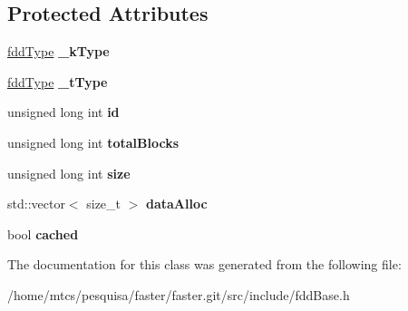 \subsection*{Protected Attributes}
\begin{DoxyCompactItemize}
\item 
\hypertarget{classfaster_1_1fddBase_a585bdd9659c1ab92cf615c73fc4d9ac7}{}\label{classfaster_1_1fddBase_a585bdd9659c1ab92cf615c73fc4d9ac7} 
\hyperlink{namespacefaster_aa8898687bc64536b60a3d5f365060cd6}{fdd\+Type} {\bfseries \+\_\+k\+Type}
\item 
\hypertarget{classfaster_1_1fddBase_a7ee5fc280f8eed2ffe97ef9c7a8b0919}{}\label{classfaster_1_1fddBase_a7ee5fc280f8eed2ffe97ef9c7a8b0919} 
\hyperlink{namespacefaster_aa8898687bc64536b60a3d5f365060cd6}{fdd\+Type} {\bfseries \+\_\+t\+Type}
\item 
\hypertarget{classfaster_1_1fddBase_a6ebf1389a80e31abed31f5b85d99fa1a}{}\label{classfaster_1_1fddBase_a6ebf1389a80e31abed31f5b85d99fa1a} 
unsigned long int {\bfseries id}
\item 
\hypertarget{classfaster_1_1fddBase_ac69c521f69cbe163b676f7723c9dd024}{}\label{classfaster_1_1fddBase_ac69c521f69cbe163b676f7723c9dd024} 
unsigned long int {\bfseries total\+Blocks}
\item 
\hypertarget{classfaster_1_1fddBase_a397adc12ccc9f7eccce83dfef625487c}{}\label{classfaster_1_1fddBase_a397adc12ccc9f7eccce83dfef625487c} 
unsigned long int {\bfseries size}
\item 
\hypertarget{classfaster_1_1fddBase_a47961f2f165f2e148d9cbbd1b59090d3}{}\label{classfaster_1_1fddBase_a47961f2f165f2e148d9cbbd1b59090d3} 
std\+::vector$<$ size\+\_\+t $>$ {\bfseries data\+Alloc}
\item 
\hypertarget{classfaster_1_1fddBase_acd5a472da183f35b13197804acadac4e}{}\label{classfaster_1_1fddBase_acd5a472da183f35b13197804acadac4e} 
bool {\bfseries cached}
\end{DoxyCompactItemize}


The documentation for this class was generated from the following file\+:\begin{DoxyCompactItemize}
\item 
/home/mtcs/pesquisa/faster/faster.\+git/src/include/fdd\+Base.\+h\end{DoxyCompactItemize}
